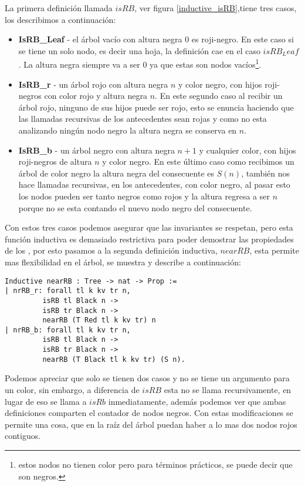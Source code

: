 La primera definici\'on llamada $isRB$, ver figura \ref{inductive_isRB},tiene tres casos, los
describimos a continuaci\'on:
\begin{itemize}
        \item \textbf{IsRB\_Leaf} - el árbol vacío con altura negra 0 es roji-negro. En este caso
        si se tiene un solo nodo, es decir una hoja, la definici\'on cae en el caso $isRB_Leaf$.
        La altura negra siempre va a ser 0 ya que estas son nodos vacíos\footnote{estos nodos no
        tienen color pero para términos prácticos, se puede decir que son negros.}.
        \item \textbf{IsRB\_r} - un árbol rojo con altura negra $n$ y color negro, con hijos
        roji-negros con color rojo y altura negra $n$. En este segundo caso al recibir un \'arbol
        rojo, ninguno de sus hijos puede ser rojo, esto se enuncia haciendo que las llamadas
        recursivas de los antecedentes sean rojas y como no esta analizando ningún nodo negro la
        altura negra se conserva en $n$.
        \item \textbf{IsRB\_b} - un árbol negro con altura negra $n+1$ y cualquier color, con hijos
        roji-negros de altura $n$ y color negro. En este \'ultimo caso como recibimos un \'arbol
        de color negro la altura negra del consecuente es $S(n)$, también nos hace llamadas
        recursivas, en los antecedentes, con color negro, al pasar esto los nodos pueden ser tanto
        negros como rojos y la altura regresa a ser $n$ porque no se esta contando el nuevo nodo
        negro del consecuente.
\end{itemize}

Con estos tres casos podemos asegurar que las invariantes se respetan, pero esta funci\'on
inductiva es demasiado restrictiva para poder demostrar las propiedades de los {\arns}, por esto
pasamos a la segunda definici\'on inductiva, $nearRB$,  esta permite mas flexibilidad en el \'
arbol, se muestra y describe a continuaci\'on:

\begin{verbatim}
Inductive nearRB : Tree -> nat -> Prop :=
| nrRB_r: forall tl k kv tr n,
         isRB tl Black n ->
         isRB tr Black n ->
         nearRB (T Red tl k kv tr) n
| nrRB_b: forall tl k kv tr n,
         isRB tl Black n ->
         isRB tr Black n ->
         nearRB (T Black tl k kv tr) (S n).
\end{verbatim}
Podemos apreciar que solo se tienen dos casos y no se tiene un argumento para un color, sin
embargo, a diferencia de $isRB$ esta no se llama recursivamente, en lugar de eso se llama a $isRb$
inmediatamente, además podemos ver que ambas definiciones comparten el contador de nodos negros.
Con estas modificaciones se permite una cosa, que en la ra\'iz del \'arbol puedan haber a lo mas
dos nodos rojos contiguos.

